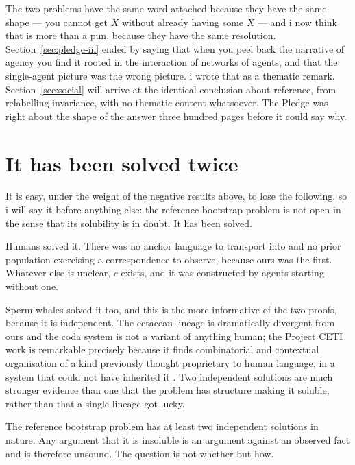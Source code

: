 The two problems have the same word attached because they have the
same shape --- you cannot get $X$ without already having some $X$
--- and i now think that is more than a pun, because they have the
same resolution.
Section~\ref{sec:pledge-iii} ended by saying that when you peel
back the narrative of agency you find it rooted in the interaction
of networks of agents, and that the single-agent picture was the
wrong picture.
i wrote that as a thematic remark.
Section~\ref{sec:social} will arrive at the identical conclusion
about reference, from relabelling-invariance, with no thematic
content whatsoever.
The Pledge was right about the shape of the answer three hundred
pages before it could say why.

\section{It has been solved twice}
\label{sec:soluble}

It is easy, under the weight of the negative results above, to lose
the following, so i will say it before anything else:
the reference bootstrap problem is not open in the sense that its
solubility is in doubt.
It has been solved.

Humans solved it.
There was no anchor language to transport into and no prior
population exercising a correspondence to observe, because ours was
the first.
Whatever else is unclear, $c$ exists, and it was constructed by
agents starting without one.

Sperm whales solved it too, and this is the more informative of the
two proofs, because it is independent.
The cetacean lineage is dramatically divergent from ours and the
coda system is not a variant of anything human; the Project CETI
work is remarkable precisely because it finds combinatorial and
contextual organisation of a kind previously thought proprietary to
human language, in a system that could not have inherited it
\cite{sharma2024,begus2026}.
Two independent solutions are much stronger evidence than one that
the problem has structure making it soluble, rather than that a
single lineage got lucky.

\begin{observation}[Existence]
\label{obs:soluble}
The reference bootstrap problem has at least two independent
solutions in nature.
Any argument that it is insoluble is an argument against an
observed fact and is therefore unsound.
The question is not whether but how.
\end{observation}

